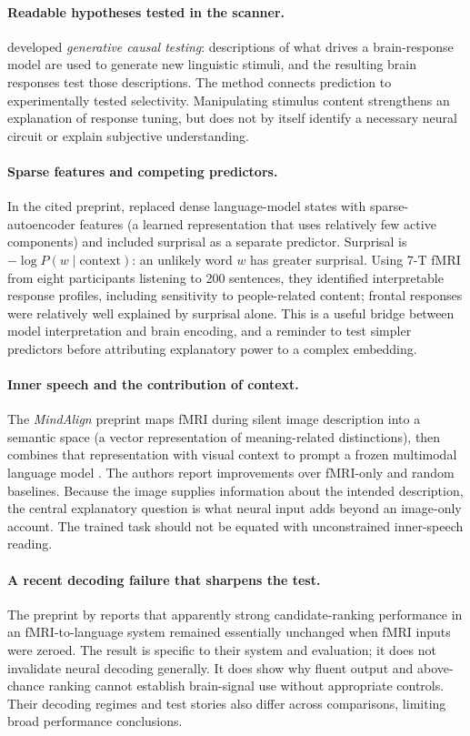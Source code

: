 \documentclass[11pt,a4paper]{article}
\begin{document}
\paragraph{Readable hypotheses tested in the scanner.}
\citet{antonello2026} developed \emph{generative causal testing}: descriptions of what drives a brain-response model are used to generate new linguistic stimuli, and the resulting brain responses test those descriptions. The method connects prediction to experimentally tested selectivity. Manipulating stimulus content strengthens an explanation of response tuning, but does not by itself identify a necessary neural circuit or explain subjective understanding.

\paragraph{Sparse features and competing predictors.}
In the cited preprint, \citet{lepori2026} replaced dense language-model states with sparse-autoencoder features (a learned representation that uses relatively few active components) and included surprisal as a separate predictor. Surprisal is $-\log P(w\mid\text{context})$: an unlikely word $w$ has greater surprisal. Using 7-T fMRI from eight participants listening to 200 sentences, they identified interpretable response profiles, including sensitivity to people-related content; frontal responses were relatively well explained by surprisal alone. This is a useful bridge between model interpretation and brain encoding, and a reminder to test simpler predictors before attributing explanatory power to a complex embedding.

\paragraph{Inner speech and the contribution of context.}
The \emph{MindAlign} preprint maps fMRI during silent image description into a semantic space (a vector representation of meaning-related distinctions), then combines that representation with visual context to prompt a frozen multimodal language model \citep{liu2026mindalign}. The authors report improvements over fMRI-only and random baselines. Because the image supplies information about the intended description, the central explanatory question is what neural input adds beyond an image-only account. The trained task should not be equated with unconstrained inner-speech reading.

\paragraph{A recent decoding failure that sharpens the test.}
The preprint by \citet{suvakovic2026} reports that apparently strong candidate-ranking performance in an fMRI-to-language system remained essentially unchanged when fMRI inputs were zeroed. The result is specific to their system and evaluation; it does not invalidate neural decoding generally. It does show why fluent output and above-chance ranking cannot establish brain-signal use without appropriate controls. Their decoding regimes and test stories also differ across comparisons, limiting broad performance conclusions.
\end{document}
